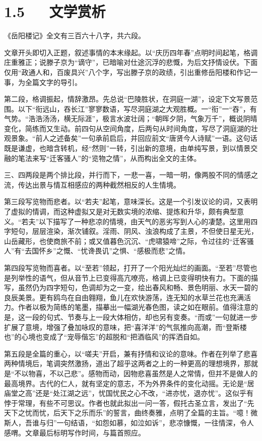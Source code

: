 \documentclass[letterpaper,12pt,english]{sphinxmanual}
\begin{document}
\section{1.5   文学赏析}
\label{\detokenize{p01_u6563_u6587/_u8303_u4ef2_u6df9-_u5cb3_u9633_u697c_u8bb0:id7}}
《岳阳楼记》全文有三百六十八字，共六段。

文章开头即切入正题，叙述事情的本末缘起。以“庆历四年春”点明时间起笔，格调庄重雅正；说滕子京为“谪守”，已暗喻对仕途沉浮的悲慨，为后文抒情设伏。下面仅用“政通人和，百废具兴”八个字，写出滕子京的政绩，引出重修岳阳楼和作记一事，为全篇文字的导引。

第二段，格调振起，情辞激昂。先总说“巴陵胜状，在洞庭一湖”，设定下文写景范围。以下“衔远山，吞长江”寥寥数语，写尽洞庭湖之大观胜概。一“衔”一“吞”，有气势。“浩浩汤汤，横无际涯”，极言水波壮阔；“朝晖夕阴，气象万千”，概说阴晴变化，简练而又生动。前四句从空间角度，后两句从时间角度，写尽了洞庭湖的壮观景象。“前人之述备矣”一句承前启后，并回应前文“唐贤今人诗赋”一语。这句话既是谦虚，也暗含转机，经“然则”一转，引出新的意境，由单纯写景，到以情景交融的笔法来写“迁客骚人”的“览物之情”，从而构出全文的主体。

三、四两段是两个排比段，并行而下，一悲一喜，一暗一明，像两股不同的情感之流，传达出景与情互相感应的两种截然相反的人生情境。

第三段写览物而悲者。以“若夫”起笔，意味深长。这是一个引发议论的词，又表明了虚拟的情调，而这种虚拟又是对无数实境的浓缩、提炼和升华，颇有典型意义。“若夫”以下描写了一种悲凉的情境，由天气的恶劣写到人心的凄楚。这里用四字短句，层层渲染，渐次铺叙。淫雨、阴风、浊浪构成了主景，不但使日星无光，山岳藏形，也使商旅不前；或又值暮色沉沉、“虎啸猿啼”之际，令过往的“迁客骚人”有“去国怀乡”之慨、“忧谗畏讥”之惧、“感极而悲”之情。

第四段写览物而喜者。以“至若”领起，打开了一个阳光灿烂的画面。“至若”尽管也是列举性的语气，但从音节上已变得高亢嘹亮，格调上已变得明快有力。下面的描写，虽然仍为四字短句，色调却为之一变，绘出春风和畅、景色明丽、水天一碧的良辰美景。更有鸥鸟在自由翱翔，鱼儿在欢快游荡，连无知的水草兰花也充满活力。作者以极为简练的笔墨，描摹出一幅湖光春色图，读之如在眼前。值得注意的是，这一段的句式、节奏与上一段大体相仿，却也另有变奏。“而或”一句就进一步扩展了意境，增强了叠加咏叹的意味，把“喜洋洋”的气氛推向高潮，而“登斯楼也”的心境也变成了“宠辱偕忘”的超脱和“把酒临风”的挥洒自如。

第五段是全篇的重心，以“嗟夫”开启，兼有抒情和议论的意味。作者在列举了悲喜两种情境后，笔调突然激扬，道出了超乎这两者之上的一种更高的理想境界，那就是“不以物喜，不以己悲”。感物而动，因物悲喜虽然是人之常情，但并不是做人的最高境界。古代的仁人，就有坚定的意志，不为外界条件的变化动摇。无论是“居庙堂之高”还是“处江湖之远”，忧国忧民之心不改，“进亦忧，退亦忧”。这似乎有悖于常理，有些不可思议。作者也就此拟出一问一答，假托古圣立言，发出了“先天下之忧而忧，后天下之乐而乐”的誓言，曲终奏雅，点明了全篇的主旨。“噫！微斯人，吾谁与归”一句结语，“如怨如慕，如泣如诉”，悲凉慷慨，一往情深，令人感喟。文章最后标明写作时间，与篇首照应。
\end{document}
